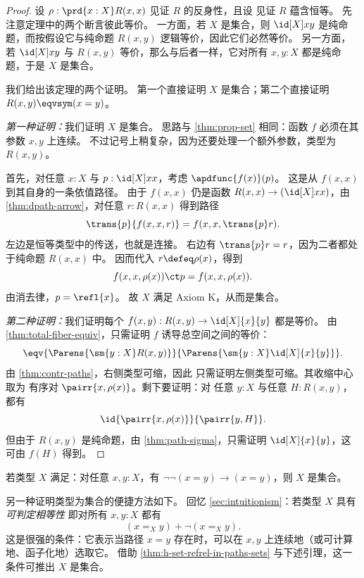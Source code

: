 \begin{proof}
  设 $\rho : \prd{x:X} R(x,x)$ 见证 $R$ 的反身性，且设  见证 $R$
蕴含恒等。
  先注意定理中的两个断言彼此等价。
  一方面，若 $X$ 是集合，则 $\id[X]xy$ 是纯命题，而按假设它与纯命题
$R(x,y)$ 逻辑等价，因此它们必然等价。
  另一方面，若 $\id[X]xy$ 与 $R(x,y)$ 等价，那么与后者一样，它对所有 $x,y:X$ 都是纯命题，于是 $X$
是集合。

  我们给出该定理的两个证明。
  第一个直接证明 $X$ 是集合；第二个直接证明 $R(x,y)\eqvsym (x=y)$。

  \emph{第一种证明：}我们证明 $X$ 是集合。
  思路与 \cref{thm:prop-set} 相同：函数 $f$ 必须在其参数 $x,y$ 上连续。
  不过记号上稍复杂，因为还要处理一个额外参数，类型为 $R(x,y)$。

  首先，对任意 $x:X$ 与 $p:\id[X]xx$，考虑 $\apdfunc{f(x)}(p)$。
  这是从 $f(x,x)$ 到其自身的一条依值路径。
  由于 $f(x,x)$ 仍是函数 $R(x,x) \to (\id[X]xx)$，由 \cref{thm:dpath-arrow}，对任意 $r:R(x,x)$ 得到路径
  \[\trans{p}{f(x,x,r)} = f(x,x,\trans{p}r).
  \]
  左边是恒等类型中的传送，也就是连接。
  右边有 $\trans{p}r = r$，因为二者都处于纯命题 $R(x,x)$ 中。
  因而代入 $r\defeq \rho(x)$，得到
  \[ f(x,x,\rho(x)) \ct p = f(x,x,\rho(x)). \]
  由消去律，$p=\refl{x}$。
  故 $X$ 满足 Axiom K，从而是集合。

  \emph{第二种证明：}我们证明每个 $f(x,y) : R(x,y) \to \id[X]{x}{y}$ 都是等价。
  由 \cref{thm:total-fiber-equiv}，只需证明 $f$ 诱导总空间之间的等价：
  \begin{equation*}
    \eqv{\Parens{\sm{y:X}R(x,y)}}{\Parens{\sm{y:X}\id[X]{x}{y}}}.
  \end{equation*}
  由 \cref{thm:contr-paths}，右侧类型可缩，因此
  只需证明左侧类型可缩。其收缩中心取为
  有序对 $\pairr{x,\rho(x)}$。剩下要证明：对
  任意 ${y:X}$ 与任意 ${H:R(x,y)}$，都有
  \begin{equation*}
    \id{\pairr{x,\rho(x)}}{\pairr{y,H}}.
  \end{equation*}
  但由于 $R(x,y)$ 是纯命题，由 \cref{thm:path-sigma}，只需证明
  $\id[X]{x}{y}$，这可由 $f(H)$ 得到。
\end{proof}

\begin{cor}\label{notnotstable-equality-to-set}
  若类型 $X$ 满足：对任意 $x,y:X$，有 $\neg\neg(x=y)\to(x=y)$，则 $X$ 是集合。
\end{cor}

另一种证明类型为集合的便捷方法如下。
回忆 \cref{sec:intuitionism}：若类型 $X$ 具有\emph{可判定相等性}
%
即对所有 $x, y : X$ 都有
\[(x =_X y) + \neg (x =_X y).\]
%
%
这是很强的条件：它表示当路径 $x=y$ 存在时，可以在 $x,y$ 上连续地（或可计算地、函子化地）选取它。
借助 \cref{thm:h-set-refrel-in-paths-sets} 与下述引理，这一条件可推出 $X$ 是集合。

